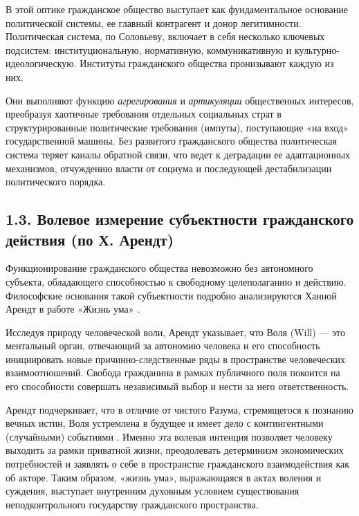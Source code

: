 В этой оптике гражданское общество выступает как фундаментальное основание политической системы, ее главный контрагент и донор легитимности. Политическая система, по Соловьеву, включает в себя несколько ключевых подсистем: институциональную, нормативную, коммуникативную и культурно-идеологическую. Институты гражданского общества пронизывают каждую из них. 

Они выполняют функцию \textit{агрегирования} и \textit{артикуляции} общественных интересов, преобразуя хаотичные требования отдельных социальных страт в структурированные политические требования (импуты), поступающие «на вход» государственной машины. Без развитого гражданского общества политическая система теряет каналы обратной связи, что ведет к деградации ее адаптационных механизмов, отчуждению власти от социума и последующей дестабилизации политического порядка.

\subsection{1.3. Волевое измерение субъектности гражданского действия (по Х. Арендт)}
Функционирование гражданского общества невозможно без автономного субъекта, обладающего способностью к свободному целеполаганию и действию. Философские основания такой субъектности подробно анализируются Ханной Арендт в работе «Жизнь ума» \cite{Arendt}. 

Исследуя природу человеческой воли, Арендт указывает, что Воля (Will) — это ментальный орган, отвечающий за автономию человека и его способность инициировать новые причинно-следственные ряды в пространстве человеческих взаимоотношений. Свобода гражданина в рамках публичного поля покоится на его способности совершать независимый выбор и нести за него ответственность. 

Арендт подчеркивает, что в отличие от чистого Разума, стремящегося к познанию вечных истин, Воля устремлена в будущее и имеет дело с контингентными (случайными) событиями \cite{Arendt}. Именно эта волевая интенция позволяет человеку выходить за рамки приватной жизни, преодолевать детерминизм экономических потребностей и заявлять о себе в пространстве гражданского взаимодействия как об акторе. Таким образом, «жизнь ума», выражающаяся в актах воления и суждения, выступает внутренним духовным условием существования неподконтрольного государству гражданского пространства.

\newpage

